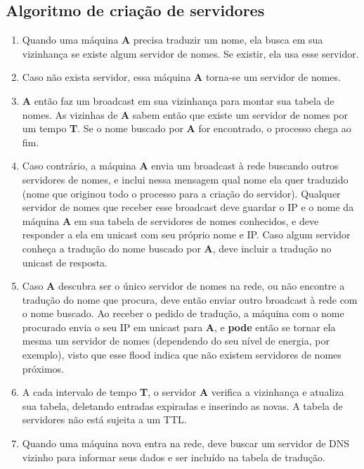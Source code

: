    \subsection{Algoritmo de criação de servidores}
        \begin{enumerate}
            \item Quando uma máquina \textbf{A} precisa traduzir um nome, ela
            busca em sua vizinhança se existe algum servidor de nomes. Se existir,
            ela usa esse servidor.
            \item Caso não exista servidor, essa máquina \textbf{A} torna-se um 
            servidor de nomes.
            \item \textbf{A} então faz um broadcast em sua vizinhança para montar
            sua tabela de nomes. As vizinhas de \textbf{A} sabem então que existe
            um servidor de nomes por um tempo \textbf{T}. Se o nome buscado por
            \textbf{A} for encontrado, o processo chega ao fim.
            \item Caso contrário, a máquina \textbf{A} envia um broadcast à rede
            buscando outros servidores de nomes, e inclui nessa mensagem qual nome
            ela quer traduzido (nome que originou todo o processo para a criação
            do servidor). Qualquer servidor de nomes que receber esse broadcast
            deve guardar o IP e o nome da máquina \textbf{A} em sua tabela de
            servidores de nomes conhecidos, e deve responder a ela em unicast com
            seu próprio nome e IP. Caso algum servidor conheça a tradução do nome
            buscado por \textbf{A}, deve incluir a tradução no unicast de resposta.
            \item Caso \textbf{A} descubra ser o único servidor de nomes na rede,
            ou não encontre a tradução do nome que procura, deve então enviar
            outro broadcast à rede com o nome buscado. Ao receber o pedido de
            tradução, a máquina com o nome procurado envia o seu IP em unicast
            para \textbf{A}, e \textbf{pode} então se tornar ela mesma um servidor
            de nomes (dependendo do seu nível de energia, por exemplo), visto que
            esse flood indica que não existem servidores de nomes próximos.
            \item A cada intervalo de tempo \textbf{T}, o servidor \textbf{A}
            verifica a vizinhança e atualiza sua tabela, deletando entradas expiradas
            e inserindo as novas. A tabela de servidores não está sujeita a um TTL.
            \item Quando uma máquina nova entra na rede, deve buscar um servidor
            de DNS vizinho para informar seus dados e ser incluído na tabela de
            tradução.
        \end{enumerate}
    
